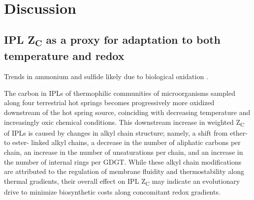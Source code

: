 
\section{Discussion}

\subsection{IPL Z\textsubscript{C} as a proxy for adaptation to both temperature and redox}
Trends in ammonium and sulfide likely due to biological oxidation \citep{cox2011transition, loiacono2012evidence}.

The carbon in IPLs of thermophilic communities of microorganisms sampled along four terrestrial hot springs becomes progressively more oxidized downstream of the hot spring source, coinciding with decreasing temperature and increasingly oxic chemical conditions. This downstream increase in weighted Z\textsubscript{C} of IPLs is caused by changes in alkyl chain structure; namely, a shift from ether- to ester- linked alkyl chains, a decrease in the number of aliphatic carbons per chain, an increase in the number of unsaturations per chain, and an increase in the number of internal rings per GDGT. While these alkyl chain modifications are attributed to the regulation of membrane fluidity and thermostability along thermal gradients, their overall effect on IPL Z\textsubscript{C} may indicate an evolutionary drive to minimize biosynthetic costs along concomitant redox gradients.

